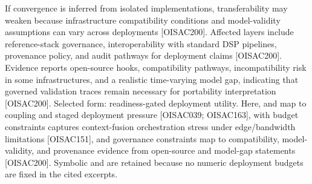 {}
\markdownRendererSectionEnd \markdownRendererSectionBegin
{}\markdownRendererInterblockSeparator
{}If convergence is inferred from isolated implementations, transferability may weaken because infrastructure compatibility conditions and model-validity assumptions can vary across deployments [O\markdownRendererUnderscore{}ISAC\markdownRendererUnderscore{}200]. Affected layers include reference-stack governance, interoperability with standard DSP pipelines, provenance policy, and audit pathways for deployment claims [O\markdownRendererUnderscore{}ISAC\markdownRendererUnderscore{}200]. Evidence reports open-source hooks, compatibility pathways, incompatibility risk in some infrastructures, and a realistic time-varying model gap, indicating that governed validation traces remain necessary for portability interpretation [O\markdownRendererUnderscore{}ISAC\markdownRendererUnderscore{}200].\markdownRendererInterblockSeparator
{}
\markdownRendererSectionEnd \markdownRendererSectionBegin
{}\markdownRendererInterblockSeparator
{}Selected form: readiness-gated deployment utility.\markdownRendererParagraphSeparator
{}\markdownRendererParagraphSeparator
{}Here,  and  map to coupling and staged deployment pressure [O\markdownRendererUnderscore{}ISAC\markdownRendererUnderscore{}039; O\markdownRendererUnderscore{}ISAC\markdownRendererUnderscore{}163],  with budget constraints captures context-fusion orchestration stress under edge/bandwidth limitations [O\markdownRendererUnderscore{}ISAC\markdownRendererUnderscore{}151], and governance constraints map to compatibility, model-validity, and provenance evidence from open-source and model-gap statements [O\markdownRendererUnderscore{}ISAC\markdownRendererUnderscore{}200]. Symbolic  and  are retained because no numeric deployment budgets are fixed in the cited excerpts.\markdownRendererInterblockSeparator
